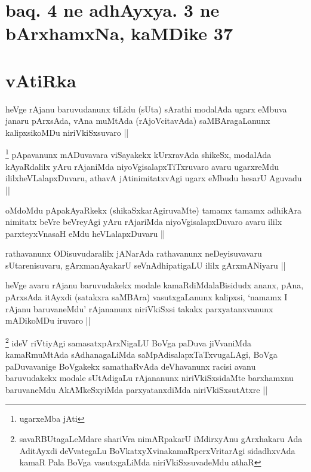 \section*{baq. 4 ne adhAyxya. 3 ne bArxhamxNa, kaMDike 37}

\stext

\section*{vAtiRka}

\begin{artha}
heVge rAjanu baruvudanunx tiLidu (sUta) sArathi modalAda ugarx eMbuva
janaru pArxsAda, vAna muMtAda (rAjoVcitavAda) saMBAragaLanunx
kalipxsikoMDu niriVkiSxsuvaro ||
\end{artha}


\begin{artha}
\footnote[1]{ugarxeMba jAti}
pApavanunx mADuvavara viSayakekx kUrxravAda shikeSx, modalAda
kAyaRdalilx yAru rAjaniMda niyoVgisalapxTiTxruvaro avaru ugarxreMdu
ililxheVLalapxDuvaru, athavA jAtinimitatxvAgi ugarx eMbudu hesarU
Aguvadu ||
\end{artha}


\begin{artha}
oMdoMdu pApakAyaRkekx (shikaSxkarAgiruvaMte) tamamx tamamx adhikAra
nimitatx beVre beVreyAgi yAru rAjariMda niyoVgisalapxDuvaro avaru
ililx parxteyxVnasaH eMdu heVLalapxDuvaru ||
\end{artha}


\begin{artha}
rathavanunx ODisuvudaralilx jANarAda rathavanunx neDeyisuvavaru
sUtarenisuvaru, gArxmanAyakarU seVnAdhipatigaLU ililx gArxmANiyaru ||
\end{artha}

\begin{artha}
heVge avaru rAjanu baruvudakekx modale kamaRdiMdalaBisidudx ananx, pAna,
pArxsAda itAyxdi (satakxra saMBAra) vasutxgaLanunx kalipxsi, `namamx I
rAjanu baruvaneMdu' rAjananunx niriVkiSxsi takakx parxyatanxvanunx
mADikoMDu iruvaro ||
\end{artha}


\begin{artha}
\footnote[1]{savaRBUtagaLeMdare shariVra nimARpakarU iMdirxyAnu
  gArxhakaru Ada AditAyxdi deVvategaLu BoVkatxyXvinakamaRperxVritarAgi
sidadhxvAda kamaR Pala BoVga vasutxgaLiMda  niriVkiSxsuvadeMdu athaR}
ideV riVtiyAgi samasatxpArxNigaLU BoVga paDuva jiVvaniMda kamaRmuMtAda
sAdhanagaLiMda saMpAdisalapxTaTxvugaLAgi, BoVga paDuvavanige BoVgakekx
samathaRvAda deVhavanunx racisi avanu baruvudakekx modale sUtAdigaLu
rAjananunx niriVkiSxsidaMte barxhamxnu baruvaneMdu AkAMkeSxyiMda
parxyatanxdiMda niriVkiSxsutAtxre ||
\end{artha}

